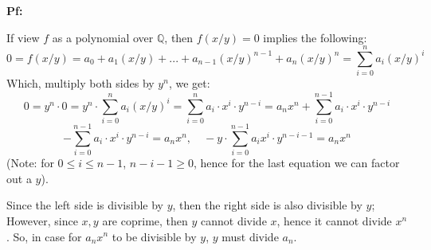 \documentclass{article}
\begin{document}
\textbf{Pf:}

If view $f$ as a polynomial over $\mathbb{Q}$, then $f(x/y)=0$ implies the following:
$$0=f(x/y)=a_0+a_1(x/y) + ... + a_{n-1}(x/y)^{n-1}+a_n(x/y)^n=\sum_{i=0}^{n}a_i(x/y)^i$$
Which, multiply both sides by $y^n$, we get:
$$0=y^n\cdot 0 = y^n\cdot \sum_{i=0}^{n}a_i(x/y)^i = \sum_{i=0}^{n}a_i\cdot x^i\cdot y^{n-i} = a_nx^n + \sum_{i=0}^{n-1}a_i\cdot x^i\cdot y^{n-i}$$
$$-\sum_{i=0}^{n-1}a_i\cdot x^i\cdot y^{n-i} = a_nx^n,\quad -y\cdot \sum_{i=0}^{n-1}a_ix^i\cdot y^{n-i-1} = a_nx^n$$
(Note: for $0\leq i\leq n-1$, $n-i-1 \geq 0$, hence for the last equation we can factor out a $y$).

Since the left side is divisible by $y$, then the right side is also divisible by $y$;
However, since $x,y$ are coprime, then $y$ cannot divide $x$, hence it cannot divide $x^n$. So, in case for $a_nx^n$ to be divisible by $y$, $y$ must divide $a_n$.
\end{document}
